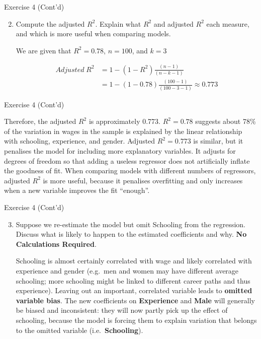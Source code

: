\documentclass[
  ignorenonframetext,
  aspectratio=43,
]{beamer}
\let\olditem\item
\renewcommand\item{\olditem\justifying}
\begin{document}
\begin{frame}{Exercise 4 (Cont'd)}
\protect\hypertarget{exercise-4-contd-1}{}
\begin{enumerate}
\setcounter{enumi}{1}
\item
  Compute the adjusted \(R^2\). Explain what \(R^2\) and adjusted
  \(R^2\) each measure, and which is more useful when comparing models.

  \pause

  We are given that \(R^2=0.78\), \(n=100\), and \(k=3\) \vspace{-15pt}

  \pause

  \[
   \begin{aligned}
   Adjusted\; R^2&=1-(1-R^2 )\frac{(n-1)}{(n-k-1)} \\ &=1-(1-0.78)\frac{(100-1)}{(100-3-1)}\approx0.773
   \end{aligned}
   \]
\end{enumerate}
\end{frame}

\begin{frame}{Exercise 4 (Cont'd)}
\protect\hypertarget{exercise-4-contd-2}{}
\pause

Therefore, the adjusted \(R^2\) is approximately 0.773. \(R^2=0.78\)
suggests about 78\% of the variation in wages in the sample is explained
by the linear relationship with schooling, experience, and gender.
Adjusted \(R^2=0.773\) is similar, but it penalises the model for
including more explanatory variables. It adjusts for degrees of freedom
so that adding a useless regressor does not artificially inflate the
goodness of fit. When comparing models with different numbers of
regressors, adjusted \(R^2\) is more useful, because it penalises
overfitting and only increases when a new variable improves the fit
``enough''.
\end{frame}

\begin{frame}{Exercise 4 (Cont'd)}
\protect\hypertarget{exercise-4-contd-3}{}
\begin{enumerate}
\setcounter{enumi}{2}
\item
  Suppose we re-estimate the model but omit Schooling from the
  regression. Discuss what is likely to happen to the estimated
  coefficients and why. \textbf{No Calculations Required}.

  \pause

  Schooling is almost certainly correlated with wage and likely
  correlated with experience and gender (e.g.~men and women may have
  different average schooling; more schooling might be linked to
  different career paths and thus experience). Leaving out an important,
  correlated variable leads to \textbf{omitted variable bias}. The new
  coefficients on \textbf{Experience} and \textbf{Male} will generally
  be biased and inconsistent: they will now partly pick up the effect of
  schooling, because the model is forcing them to explain variation that
  belongs to the omitted variable (i.e.~\textbf{Schooling}).
\end{enumerate}
\end{frame}
\end{document}
